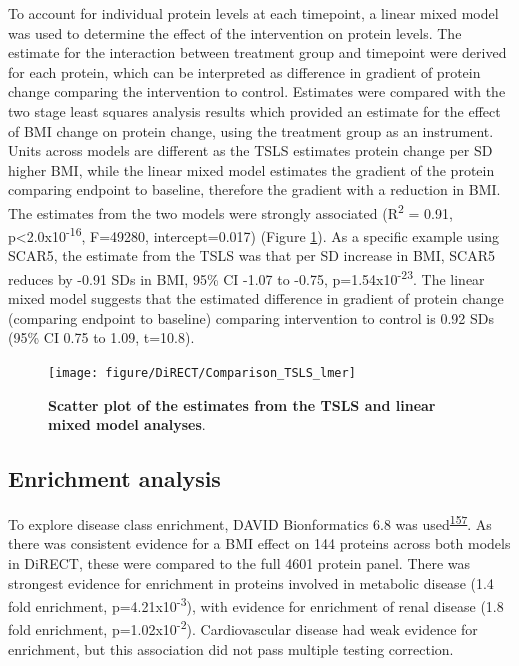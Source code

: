 \documentclass[11pt,twoside]{bristolthesis}
\begin{document}
To account for individual protein levels at each timepoint, a linear mixed model was used to determine the effect of the intervention on protein levels. The estimate for the interaction between treatment group and timepoint were derived for each protein, which can be interpreted as difference in gradient of protein change comparing the intervention to control. Estimates were compared with the two stage least squares analysis results which provided an estimate for the effect of BMI change on protein change, using the treatment group as an instrument. Units across models are different as the TSLS estimates protein change per SD higher BMI, while the linear mixed model estimates the gradient of the protein comparing endpoint to baseline, therefore the gradient with a reduction in BMI. The estimates from the two models were strongly associated (R\textsuperscript{2} = 0.91, p\textless2.0x10\textsuperscript{-16}, F=49280, intercept=0.017) (Figure \ref{fig:tsls-lmer}). As a specific example using SCAR5, the estimate from the TSLS was that per SD increase in BMI, SCAR5 reduces by -0.91 SDs in BMI, 95\% CI -1.07 to -0.75, p=1.54x10\textsuperscript{-23}. The linear mixed model suggests that the estimated difference in gradient of protein change (comparing endpoint to baseline) comparing intervention to control is 0.92 SDs (95\% CI 0.75 to 1.09, t=10.8).



\begin{figure}

{\centering \texttt{[image: figure/DiRECT/Comparison\_TSLS\_lmer]} 

}

\caption[Scatter plot of the estimates from the TSLS and linear mixed model analyses]{\textbf{Scatter plot of the estimates from the TSLS and linear mixed model analyses}.}\label{fig:tsls-lmer}
\end{figure}
\hypertarget{enrichment-analysis-1}{%
\subsection{Enrichment analysis}\label{enrichment-analysis-1}}

To explore disease class enrichment, DAVID Bionformatics 6.8 was used\textsuperscript{\protect\hyperlink{ref-Huang2009}{157}}. As there was consistent evidence for a BMI effect on 144 proteins across both models in DiRECT, these were compared to the full 4601 protein panel. There was strongest evidence for enrichment in proteins involved in metabolic disease (1.4 fold enrichment, p=4.21x10\textsuperscript{-3}), with evidence for enrichment of renal disease (1.8 fold enrichment, p=1.02x10\textsuperscript{-2}). Cardiovascular disease had weak evidence for enrichment, but this association did not pass multiple testing correction.
\end{document}
